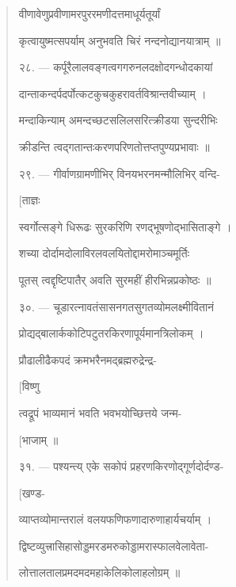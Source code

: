 \documentclass[a4paper, 11pt, oneside, french, landscape, twocolumn]{article}
\begin{document}
\begin{quotation}
\texthindi{वीणावेणुप्रवीणामरपुररमणीदत्तमाधूर्यतूर्यां}

\texthindi{कृत्वायुष्मत्सपर्याम् अनुभवति चिरं नन्दनोद्यानयात्राम् ॥}

\bigskip

\texthindi{२८}. --- \texthindi{कर्पूरैलालवङ्गत्वगगरुनलदक्षोदगन्धोदकायां}

\texthindi{दान्ताकन्दर्पदर्पोत्कटकुचकुहरावर्तविश्रान्तवीच्याम् ।}

\texthindi{मन्दाकिन्याम् अमन्दच्छटसलिलसरित्क्रीडया सुन्दरीभिः}

\texthindi{क्रीडन्ति त्वद्गतान्तःकरणपरिणतोत्तप्तपुण्यप्रभावाः ॥}

\bigskip

\texthindi{२९}. --- \texthindi{गीर्वाणग्रामणीभिर् विनयभरनमन्मौलिभिर् वन्दि-}

\hspace*{55mm}\texthindi{[ताज्ञः}

\texthindi{स्वर्गोत्सङ्गे धिरूढः सुरकरिणि रणद्भूषणोद्भासिताङ्गे ।}

\texthindi{शच्या दोर्दामदोलाविरलवलयितोद्दामरोमाञ्चमूर्तिः}

\texthindi{पूतस् त्वद्दृष्टिपातैर् अवति सुरमहीं हीरभिन्नप्रकोष्ठः ॥}

\bigskip

\texthindi{३०}. --- \texthindi{चूडारत्नावतंसासनगतसुगतव्योमलक्ष्मीवितानं}

\texthindi{प्रोद्यद्बालार्ककोटिपटुतरकिरणापूर्यमानत्रिलोकम् \texthindi{।}}

\texthindi{प्रौढालीढैकपदं क्रमभरैनमद्ब्रह्मरुद्रेन्द्र-}

\hspace*{55mm}\texthindi{[विष्णु}

\texthindi{त्वद्रूपं भाव्यमानं भवति भवभयोच्छित्तये जन्म-}

\hspace*{55mm}\texthindi{[भाजाम् ॥}

\bigskip

\texthindi{३१}. --- \texthindi{पश्यन्त्य् एके सकोपं प्रहरणकिरणोद्गूर्णदोर्दण्ड-}

\hspace*{55mm}\texthindi{[खण्ड-}

\texthindi{व्याप्तव्योमान्तरालं वलयफणिफणादारुणाहार्यचर्याम् ।}

\texthindi{द्विष्टव्युत्त्रासिहासोड्डमरडमरुकोड्डामरास्फालवेलावेता-}

\texthindi{लोत्तालतालप्रमदमदमहाकेलिकोलाहलोग्रम् ॥}

\bigskip


\end{quotation}
\end{document}
